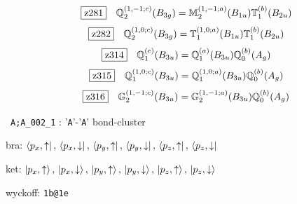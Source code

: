 \documentclass[fleqn,10pt,landscape]{jsarticle}
\begin{document}
\begin{dmath*}
\hspace*{3mm}\fbox{z281}\quad \mathbb{Q}_{2}^{(1,-1;c)}(B_{3g})=\mathbb{M}_{2}^{(1,-1;a)}(B_{1u}) \mathbb{T}_{1}^{(b)}(B_{2u})
\end{dmath*}
\begin{dmath*}
\hspace*{3mm}\fbox{z282}\quad \mathbb{Q}_{2}^{(1,0;c)}(B_{3g})=\mathbb{T}_{1}^{(1,0;a)}(B_{1u}) \mathbb{T}_{1}^{(b)}(B_{2u})
\end{dmath*}
\begin{dmath*}
\hspace*{3mm}\fbox{z314}\quad \mathbb{Q}_{1}^{(c)}(B_{3u})=\mathbb{Q}_{1}^{(a)}(B_{3u}) \mathbb{Q}_{0}^{(b)}(A_{g})
\end{dmath*}
\begin{dmath*}
\hspace*{3mm}\fbox{z315}\quad \mathbb{Q}_{1}^{(1,0;c)}(B_{3u})=\mathbb{Q}_{1}^{(1,0;a)}(B_{3u}) \mathbb{Q}_{0}^{(b)}(A_{g})
\end{dmath*}
\begin{dmath*}
\hspace*{3mm}\fbox{z316}\quad \mathbb{G}_{2}^{(1,-1;c)}(B_{3u})=\mathbb{G}_{2}^{(1,-1;a)}(B_{3u}) \mathbb{Q}_{0}^{(b)}(A_{g})
\end{dmath*}
\vspace{5mm}

\noindent\textbullet\, \texttt{A;A_002_1} : '\texttt{A}'-'\texttt{A}' bond-cluster

\noindent\quad * bra: $\bra{p_{x},\uparrow},\, \bra{p_{x},\downarrow},\, \bra{p_{y},\uparrow},\, \bra{p_{y},\downarrow},\, \bra{p_{z},\uparrow},\, \bra{p_{z},\downarrow}$

\noindent\quad * ket: $\ket{p_{x},\uparrow},\, \ket{p_{x},\downarrow},\, \ket{p_{y},\uparrow},\, \ket{p_{y},\downarrow},\, \ket{p_{z},\uparrow},\, \ket{p_{z},\downarrow}$

\noindent\quad * wyckoff: \texttt{1b@1e}
\end{document}
